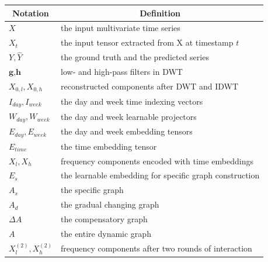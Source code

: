 \documentclass[final,12pt]{elsarticle}
\begin{document}
\begin{table}[h]
  \begin{tabular}{|l|l|}
    \hline  \multicolumn{1}{|c|}{Notation}  & \multicolumn{1}{c|}{Definition}             \\
    \hline  $X$                             & the input multivariate time series          \\
    \hline  $X_{t}$                         & the input tensor extracted from X at timestamp $t$    \\
    \hline  $Y, \widehat{Y}$                & the ground truth and the predicted series   \\
    \hline  $\textbf{g}, \textbf{h}$        & low- and high-pass filters in DWT           \\
    \hline  $X_{0, l}, X_{0, h}$            & reconstructed components after DWT and IDWT \\
    \hline  $I_{day}, I_{week}$             & the day and week time indexing vectors      \\
    \hline  $W_{day}, W_{week}$             & the day and week learnable projectors       \\
    \hline  $E_{day}, E_{week}$             & the day and week embedding tensors          \\
    \hline  $E_{time}$                      & the time embedding tensor                   \\
    \hline  $X_{l}, X_{h}$                  & frequency components encoded with time embeddings     \\
    \hline  $E_{s}$                         & the learnable embedding for specific graph construction  \\
    \hline  $A_{s}$                         & the specific graph                          \\
    \hline  $A_{d}$                         & the gradual changing graph                  \\
    \hline  $\Delta A$                      & the compensatory graph                      \\
    \hline  $A$                             & the entire dynamic graph                    \\
    \hline  $X_{l}^{(2)}, X_{h}^{(2)}$      & frequency components after two rounds of interaction  \\
    \hline
  \end{tabular}

\end{table}
\end{document}
